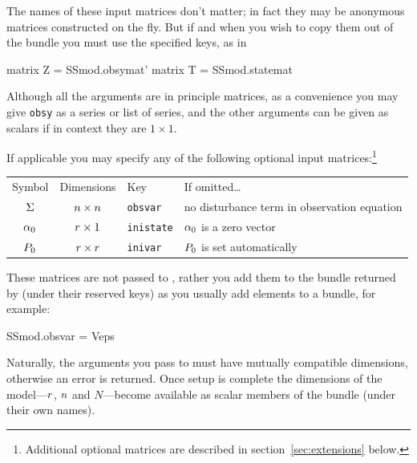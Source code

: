 
The names of these input matrices don't matter; in fact they may be
anonymous matrices constructed on the fly. But if and when you wish to
copy them out of the bundle you must use the specified keys, as in
\begin{code}
matrix Z = SSmod.obsymat'
matrix T = SSmod.statemat
\end{code}

Although all the arguments are in principle matrices, as a convenience
you may give \texttt{obsy} as a series or list of series, and the
other arguments can be given as scalars if in context they are
$1 \times 1$.

If applicable you may specify any of the following optional input
matrices:\footnote{Additional optional matrices are described in
section~\ref{sec:extensions} below.}

\begin{center}
  \begin{tabular}{ccll}
Symbol & Dimensions & Key & If omitted\dots \\[6pt]
$\Sigma$ & $n \times n$ & \texttt{obsvar} &
 no disturbance term in observation equation \\
$\alpha_0$ & $r \times 1$ & \texttt{inistate} &
 $\alpha_0$ is a zero vector\\
$P_0$ & $r \times r$ & \texttt{inivar} &
 $P_0$ is set automatically
\end{tabular}
\end{center}

These matrices are not passed to , rather you add them to
the bundle returned by  (under their reserved keys) as you
usually add elements to a bundle, for example:
\begin{code}
SSmod.obsvar = Veps
\end{code}

Naturally, the arguments you pass to  must have mutually
compatible dimensions, otherwise an error is returned. Once setup is
complete the dimensions of the model---$r$, $n$ and
$N$---become available as scalar members of the bundle (under their
own names).

